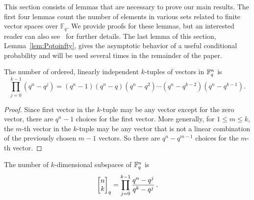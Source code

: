 This section consists of lemmas that are necessary to prove our main results.
The first four lemmas count the number of elements in various sets related to
finite vector spaces over $\mathbb{F}_q$.  We provide
proofs for these lemmas, but an interested reader can also
see~\cite{stanley2011enumerative} for further details. The last lemma of 
this section, Lemma~\ref{lem:Pqtoinfty}, gives the asymptotic behavior of a useful
conditional probability and will be used several times in the remainder of the
paper.

\begin{lemma}\label{NumkTup}
  The number of ordered, linearly independent $k$-tuples of vectors in $\mathbb{F}_q^{n}$  is
\[
\prod_{j=0}^{k-1} \left(q^n - q^j\right) = 
(q^n-1)(q^n-q)(q^n-q^2)\cdots(q^n - q^{k-2})(q^n-q^{k-1}).
\]
\end{lemma}

\begin{proof}
Since first vector in the $k$-tuple may be any vector except for the zero
vector, there are $q^n-1$ choices for the first vector.  More generally, for $1
\leq m \leq k$, the
$m$-th vector in the $k$-tuple may be any vector that is not a linear
combination of the previously chosen $m-1$ vectors. So there are $q^n -
q^{m-1}$ choices for the $m$-th vector.
\end{proof}

\begin{lemma}\label{NumkSub}
  The number of $k$-dimensional subspaces of $\mathbb{F}_q^{n}$ is
\[
  \begin{bmatrix}{n}\\ {k}\end{bmatrix}_q = \prod_{j=0}^{k-1} \frac{q^n-q^j}{q^k-q^j} \, .
\]
\end{lemma}

